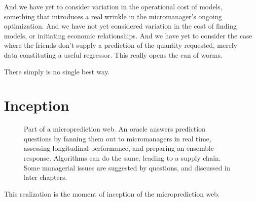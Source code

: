 And we have yet to consider variation in the operational cost of models, something that introduces a real wrinkle in the micromanager's ongoing optimization. And we have not yet considered variation in the cost of finding models, or initiating economic relationships. And we have yet to consider the case where the friends don't supply a prediction of the quantity requested, merely data constituting a useful regressor. This really opens the can of worms. 

There simply is no single best way. 


\section{Inception}


\begin{figure}
\iftikz 
{}
\else 
\fi 
\caption{Part of a microprediction web. An oracle answers prediction questions by fanning them out to micromanagers in real time, assessing longitudinal performance, and preparing an ensemble response. Algorithms can do the same, leading to a supply chain. Some managerial issues are suggested by questions, and discussed in later chapters.}
\label{fig:contest_of_contests}
\end{figure}


This realization is the moment of inception of the microprediction web.  

